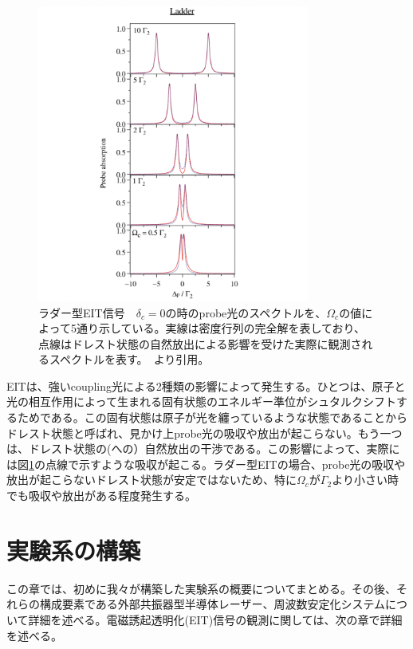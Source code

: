\documentclass[dvipdfmx]{jsreport}
\begin{document}
\begin{figure}[hbtp]
\centering
\includegraphics[width=0.8\textwidth]{images/eit_absorption.png}
\caption{\label{fig:absorption} ラダー型EIT信号　$\delta_c = 0$の時のprobe光のスペクトルを、$\Omega_c$の値によって5通り示している。実線は密度行列の完全解を表しており、点線はドレスト状態の自然放出による影響を受けた実際に観測されるスペクトルを表す。　\cite{eit-absorption}より引用。}
\end{figure}

EITは、強いcoupling光による2種類の影響によって発生する。ひとつは、原子と光の相互作用によって生まれる固有状態のエネルギー準位がシュタルクシフトするためである。この固有状態は原子が光を纏っているような状態であることからドレスト状態と呼ばれ、見かけ上probe光の吸収や放出が起こらない。もう一つは、ドレスト状態の(への）自然放出の干渉である。この影響によって、実際には図\ref{fig:absorption}の点線で示すような吸収が起こる。ラダー型EITの場合、probe光の吸収や放出が起こらないドレスト状態が安定ではないため、特に$\Omega_c$が$\Gamma_2$より小さい時でも吸収や放出がある程度発生する。

\clearpage
\chapter{実験系の構築}
この章では、初めに我々が構築した実験系の概要についてまとめる。その後、それらの構成要素である外部共振器型半導体レーザー、周波数安定化システムについて詳細を述べる。電磁誘起透明化(EIT)信号の観測に関しては、次の章で詳細を述べる。
\end{document}
